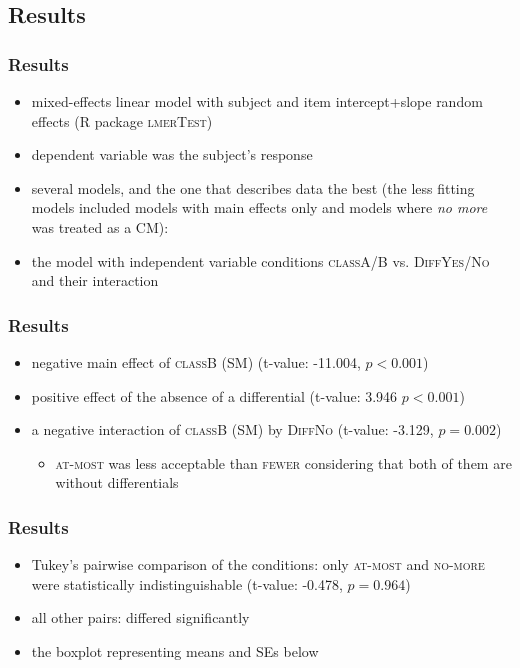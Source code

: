 \documentclass[10pt
]{beamer}
\newcommand{\cond}[1]{\textsc{#1}}
\begin{document}
\subsection{Results}

\begin{frame}
  \frametitle{Results}

\begin{itemize}
  \item mixed-effects linear model with subject and item intercept+slope random effects (R package \textsc{lmerTest})
  \item dependent variable was the subject's response
  \item several models, and the one that describes data the best (the less fitting models included models with main effects only and models where \textit{no more} was treated as a CM):
  \item the model with independent variable conditions \cond{classA/B} vs. \cond{DiffYes/No} and their interaction
\end{itemize}

\end{frame}

\begin{frame}
  \frametitle{Results}

  \begin{itemize}
    \item negative main effect of \cond{classB} (SM) (t-value: -11.004, $p < 0.001$)
    \item positive effect of the absence of a differential (t-value: 3.946 $p < 0.001$)
    \item a negative interaction of \textsc{classB} (SM) by \cond{DiffNo} (t-value: -3.129, $p =  0.002$)
    \begin{itemize}
      \item \cond{at-most} was less acceptable than \cond{fewer} considering that both of them are without differentials
    \end{itemize}
  \end{itemize}

\end{frame}

\begin{frame}
  \frametitle{Results}

  \begin{itemize}
    \item Tukey's pairwise comparison of the conditions: only \cond{at-most} and \cond{no-more} were statistically indistinguishable (t-value: -0.478, $p = 0.964$)
    \item all other pairs:  differed significantly
    \item the boxplot representing means and SEs below
  \end{itemize}

\end{frame}
\end{document}
